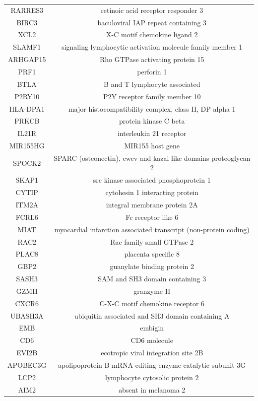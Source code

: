 \documentclass[12pt,]{book}
\theoremstyle{definition}
\theoremstyle{definition}
\theoremstyle{definition}
\theoremstyle{remark}
\begin{document}
\begin{longtable}[t]{cc}
RARRES3 & retinoic acid receptor responder 3\\
BIRC3 & baculoviral IAP repeat containing 3\\
XCL2 & X-C motif chemokine ligand 2\\
\addlinespace
SLAMF1 & signaling lymphocytic activation molecule family member 1\\
ARHGAP15 & Rho GTPase activating protein 15\\
PRF1 & perforin 1\\
BTLA & B and T lymphocyte associated\\
P2RY10 & P2Y receptor family member 10\\
\addlinespace
HLA-DPA1 & major histocompatibility complex, class II, DP alpha 1\\
PRKCB & protein kinase C beta\\
IL21R & interleukin 21 receptor\\
MIR155HG & MIR155 host gene\\
SPOCK2 & SPARC (osteonectin), cwcv and kazal like domains proteoglycan 2\\
\addlinespace
SKAP1 & src kinase associated phosphoprotein 1\\
CYTIP & cytohesin 1 interacting protein\\
ITM2A & integral membrane protein 2A\\
FCRL6 & Fc receptor like 6\\
MIAT & myocardial infarction associated transcript (non-protein coding)\\
\addlinespace
RAC2 & Rac family small GTPase 2\\
PLAC8 & placenta specific 8\\
GBP2 & guanylate binding protein 2\\
SASH3 & SAM and SH3 domain containing 3\\
GZMH & granzyme H\\
\addlinespace
CXCR6 & C-X-C motif chemokine receptor 6\\
UBASH3A & ubiquitin associated and SH3 domain containing A\\
EMB & embigin\\
CD6 & CD6 molecule\\
EVI2B & ecotropic viral integration site 2B\\
\addlinespace
APOBEC3G & apolipoprotein B mRNA editing enzyme catalytic subunit 3G\\
LCP2 & lymphocyte cytosolic protein 2\\
AIM2 & absent in melanoma 2\\

\end{longtable}
\end{document}
